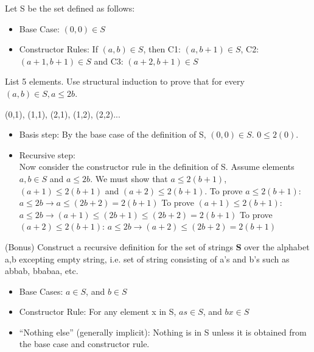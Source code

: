 \documentclass[solution, letterpaper]{cs20inclass}
\begin{document}
\problem Let S be the set defined as follows:
\begin{itemize}
\item Base Case: $(0,0) \in S$
\item Constructor Rules: If $(a,b)\in S$, then C1: $(a, b+1) \in S$, C2: $(a+1,b+1)\in S$ and C3: $(a+2, b+1)\in S$ 
\end{itemize}
\subproblem List 5 elements.
\subproblem Use structural induction to prove that for every $(a,b)\in S, a\leq 2b$.

\begin{solution}
\subsolution (0,1), (1,1), (2,1), (1,2), (2,2)...
\subsolution
\begin{itemize}
\item Basis step: By the base case of the definition of S, $(0,0)\in S$. $0\leq2(0)$.
\item Recursive step: \\
Now consider the constructor rule in the definition of S. Assume elements $a,b\in S$ and $ a\leq 2b$. We must  show that $a\leq2(b+1)$, $(a+1)\leq2(b+1)$ and $(a+2)\leq2(b+1)$.
\subitem To prove $a\leq2(b+1)$:  $a\leq2b\rightarrow a\leq(2b+2)=2(b+1)$
\subitem To prove $(a+1)\leq2(b+1)$: $a\leq2b \rightarrow (a+1)\leq(2b+1)\leq(2b+2)=2(b+1)$
\subitem To prove $(a+2)\leq2(b+1)$:  $a\leq2b \rightarrow (a+2)\leq(2b+2)=2(b+1)$
\end{itemize}
\end{solution}

\problem (Bonus) Construct a recursive definition for the set of strings \textbf{S} over the alphabet a,b excepting empty string, i.e. set of string consisting of a's and b's such as abbab, bbabaa, etc.

\begin{solution}
\begin{itemize}
\item Base Cases:  $a\in S$, and $b \in S$
\item Constructor Rule: For any element x in S, $as \in S$, and $bx \in S$
\item “Nothing else” (generally implicit): Nothing is in S unless it is obtained from the base case and constructor rule.
\end{itemize}
\end{solution}
\end{document}

